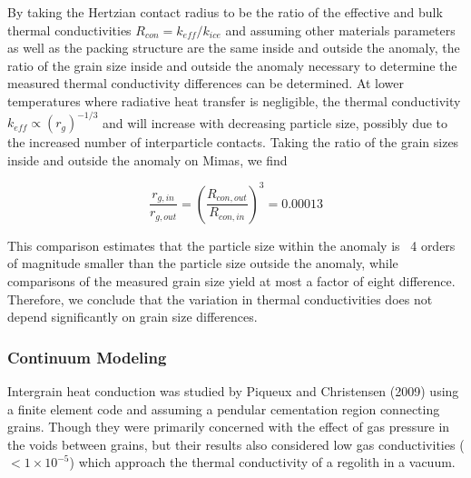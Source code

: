 \documentclass[11pt]{article} %
\begin{document}
	By taking the Hertzian contact radius to be the ratio of the effective and bulk thermal conductivities $R_{con} = k_{eff}/k_{ice}$ and assuming other materials parameters as well as the packing structure are the same inside and outside the anomaly, the ratio of the grain size inside and outside the anomaly necessary to determine the measured thermal conductivity differences can be determined. At lower temperatures where radiative heat transfer is negligible, the thermal conductivity $k_{eff} \varpropto (r_{g})^{-1/3}$ and will increase with decreasing particle size, possibly due to the increased number of interparticle contacts. Taking the ratio of the grain sizes inside and outside the anomaly on Mimas, we find
	
	\begin{equation}
	\frac{r_{g,in}}{r_{g,out}} = (\frac{R_{con,out}}{R_{con,in}})^{3} = 0.00013
	\end{equation}

	This comparison estimates that the particle size within the anomaly is ~4 orders of magnitude smaller than the particle size outside the anomaly, while comparisons of the measured grain size yield at most a factor of eight difference. Therefore, we conclude that the variation in thermal conductivities does not depend significantly on grain size differences.


\subsubsection{Continuum Modeling}
	 Intergrain heat conduction was studied by Piqueux and Christensen (2009) using a finite element code and assuming a pendular cementation region connecting grains. Though they were primarily concerned with the effect of gas pressure in the voids between grains, but their results also considered low gas conductivities ($<1 \times10^{-5}$) which approach the thermal conductivity of a regolith in a vacuum.
	
\end{document}
